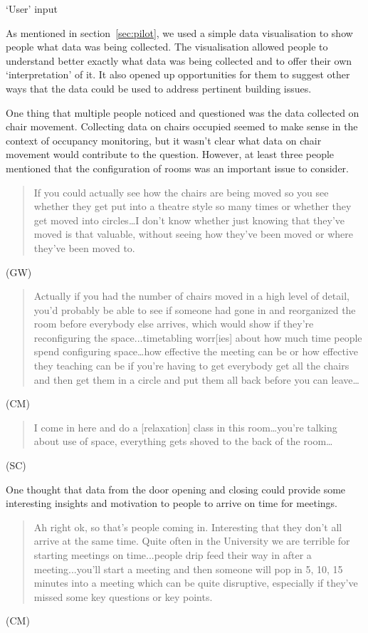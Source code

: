 ‘User’ input

As mentioned in section~\ref{sec:pilot}, we used a simple data
visualisation to show people what data was being collected. The
visualisation allowed people to understand better exactly what data
was being collected and to offer their own ‘interpretation’ of it. It
also opened up opportunities for them to suggest other ways that the
data could be used to address pertinent building issues.

One thing that multiple people noticed and questioned was the data
collected on chair movement. Collecting data on chairs occupied seemed
to make sense in the context of occupancy monitoring, but it wasn’t
clear what data on chair movement would contribute to the
question. However, at least three people mentioned that the
configuration of rooms was an important issue to consider.

\begin{quote}If you could actually see how the chairs are being moved so you see
whether they get put into a theatre style so many times or whether
they get moved into circles…I don’t know whether just knowing that
they’ve moved is that valuable, without seeing how they’ve been moved
or where they’ve been moved to.\end{quote} (GW)

\begin{quote}Actually if you had the number of chairs moved in a high level of
detail, you’d probably be able to see if someone had gone in and
reorganized the room before everybody else arrives, which would show
if they’re reconfiguring the space...timetabling worr[ies] about how
much time people spend configuring space…how effective the meeting can
be or how effective they teaching can be if you’re having to get
everybody get all the chairs and then get them in a circle and put
them all back before you can leave…\end{quote} (CM)

\begin{quote}I come in here and do a [relaxation] class in this room…you’re
talking about use of space, everything gets shoved to the back of the
room…\end{quote} (SC)

One thought that data from the door opening and closing could provide
some interesting insights and motivation to people to arrive on time
for meetings.

\begin{quote}Ah right ok, so that’s people coming in. Interesting that they don’t
all arrive at the same time. Quite often in the University we are
terrible for starting meetings on time...people drip feed their way in
after a meeting...you’ll start a meeting and then someone will pop in
5, 10, 15 minutes into a meeting which can be quite disruptive,
especially if they’ve missed some key questions or key points.\end{quote} (CM)


